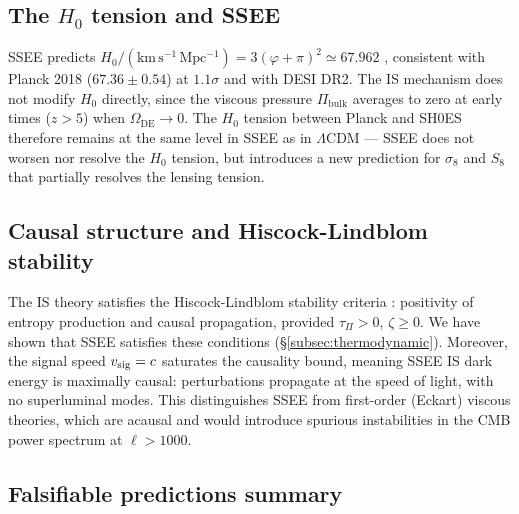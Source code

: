 \documentclass[12pt,a4paper]{article}
\newcommand{\OmDE}{\Omega_{\mathrm{DE}}}
\newcommand{\tauPi}{\tau_\Pi}
\begin{document}
\subsection{The $H_0$ tension and SSEE}
\label{subsec:H0}

SSEE predicts $H_0/(\mathrm{km\,s^{-1}\,Mpc^{-1}}) = 3(\varphi+\pi)^2 \simeq 67.962$ \citep{SSEE_Paper4},
consistent with Planck 2018 ($67.36 \pm 0.54$) at $1.1\sigma$ and with DESI DR2.
The IS mechanism does not modify $H_0$ directly, since the viscous pressure
$\Pi_{\mathrm{bulk}}$ averages to zero at early times ($z > 5$) when
$\OmDE \to 0$.
The $H_0$ tension between Planck and SH0ES therefore remains at the same
level in SSEE as in $\Lambda$CDM — SSEE does not worsen nor resolve the
$H_0$ tension, but introduces a new prediction for $\sigma_8$ and $S_8$
that partially resolves the lensing tension.

\subsection{Causal structure and Hiscock-Lindblom stability}
\label{subsec:HL}

The IS theory satisfies the Hiscock-Lindblom stability criteria
\citep{HiscockLindblom1983}: positivity of entropy production and causal
propagation, provided $\tauPi > 0$, $\zeta \geq 0$.
We have shown that SSEE satisfies these conditions (\S\ref{subsec:thermodynamic}).
Moreover, the signal speed $v_{\rm sig} = c$ saturates the causality bound,
meaning SSEE IS dark energy is maximally causal: perturbations propagate at
the speed of light, with no superluminal modes.
This distinguishes SSEE from first-order (Eckart) viscous theories, which are
acausal \citep{HiscockLindblom1985} and would introduce spurious instabilities
in the CMB power spectrum at $\ell > 1000$.

\subsection{Falsifiable predictions summary}
\label{subsec:falsifiable}
\end{document}
